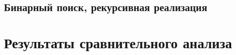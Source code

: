 \documentclass{bmstu}
\begin{document}
\subsection{Бинарный поиск, рекурсивная реализация}

\section{Результаты сравнительного анализа}


\end{document}
